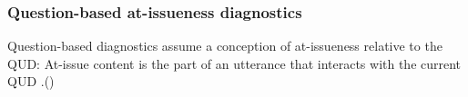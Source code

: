 \documentclass[compress, xcolor = dvipsnames, aspectratio=169, handout]{beamer}
\begin{document}
	\begin{frame}[t]\frametitle{Question-based at-issueness diagnostics}

		Question-based diagnostics assume a conception of at-issueness relative to the QUD: At-issue content is the part of an utterance that interacts with the current QUD\newline 
		\phantom.\hfill {\scriptsize(\citealt{amaral_review_2007,simons_what_2010})}




\end{frame}
\end{document}
